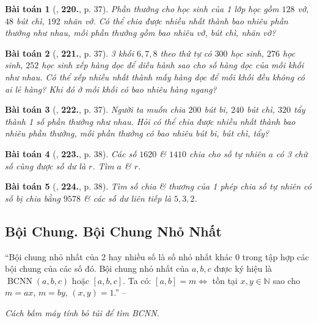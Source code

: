 \documentclass{article}
\numberwithin{equation}{section}
\newtheorem{baitoan}{Bài toán}[section]
\begin{document}
\begin{baitoan}[\cite{Binh_Toan_6_tap_1}, \textbf{220.}, p. 37]
	Phần thưởng cho học sinh của 1 lớp học gồm $128$ vở, $48$ bút chì, $192$ nhãn vở. Có thể chia được nhiều nhất thành bao nhiêu phần thưởng như nhau, mỗi phần thưởng gồm bao nhiêu vở, bút chì, nhãn vở?
\end{baitoan}

\begin{baitoan}[\cite{Binh_Toan_6_tap_1}, \textbf{221.}, p. 37]
	3 khối $6,7,8$ theo thứ tự có $300$ học sinh, $276$ học sinh, $252$ học sinh xếp hàng dọc để diễu hành sao cho số hàng dọc của mỗi khối như nhau. Có thể xếp nhiều nhất thành mấy hàng dọc để mỗi khối đều không có ai lẻ hàng? Khi đó ở mỗi khối có bao nhiêu hàng ngang?
\end{baitoan}

\begin{baitoan}[\cite{Binh_Toan_6_tap_1}, \textbf{222.}, p. 37]
	Người ta muốn chia $200$ bút bi, $240$ bút chì, $320$ tẩy thành 1 số phần thưởng như nhau. Hỏi có thể chia được nhiều nhất thành bao nhiêu phần thưởng, mỗi phần thưởng có bao nhiêu bút bi, bút chì, tẩy?
\end{baitoan}

\begin{baitoan}[\cite{Binh_Toan_6_tap_1}, \textbf{223.}, p. 38]
	Các số $1620$ \& $1410$ chia cho số tự nhiên $a$ có 3 chữ số cùng được số dư là $r$. Tìm $a$ \& $r$.
\end{baitoan}

\begin{baitoan}[\cite{Binh_Toan_6_tap_1}, \textbf{224.}, p. 38]
	Tìm số chia \& thương của 1 phép chia số tự nhiên có số bị chia bằng $9578$ \& các số dư liên tiếp là $5,3,2$.
\end{baitoan}


\subsection{Bội Chung. Bội Chung Nhỏ Nhất}
``Bội chung nhỏ nhất của 2 hay nhiều số là số nhỏ nhất khác $0$ trong tập hợp các bội chung của các số đó. Bội chung nhỏ nhất của $a,b,c$ được ký hiệu là $\operatorname{BCNN}(a,b,c)$ hoặc $[a,b,c]$. Ta có: $[a,b] = m\Leftrightarrow$ tồn tại $x,y\in\mathbb{N}$ sao cho $m = ax$, $m = by$, $(x,y) = 1$.'' -- \cite[\S10, p. 38]{Binh_Toan_6_tap_1}

\textit{Cách bấm máy tính bỏ túi để tìm BCNN.}
\end{document}
